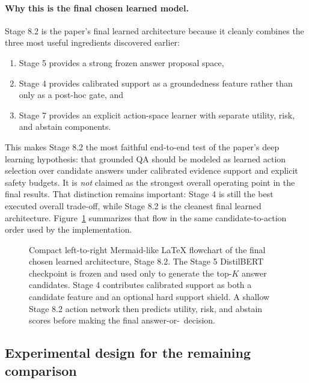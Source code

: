 \paragraph{Why this is the final chosen learned model.}
Stage 8.2 is the paper's final learned architecture because it cleanly
combines the three most useful ingredients discovered earlier:
\begin{enumerate}[leftmargin=1.25em]
  \item Stage 5 provides a strong frozen answer proposal space,
  \item Stage 4 provides calibrated support as a groundedness feature rather
  than only as a post-hoc gate, and
  \item Stage 7 provides an explicit action-space learner with separate
  utility, risk, and abstain components.
\end{enumerate}
This makes Stage 8.2 the most faithful end-to-end test of the paper's deep
learning hypothesis:
that grounded QA should be modeled as learned action selection over candidate
answers under calibrated evidence support and explicit safety budgets.
It is \emph{not} claimed as the strongest overall operating point in the final
results.
That distinction remains important:
Stage 4 is still the best executed overall trade-off, while Stage 8.2 is the
cleanest final learned architecture.
Figure~\ref{fig:stage8-2-architecture} summarizes that flow in the same
candidate-to-action order used by the implementation.

\begin{figure}[t]
  \centering
  \resizebox{0.98\textwidth}{!}{}
  \caption{Compact left-to-right Mermaid-like LaTeX flowchart of the final chosen learned
  architecture, Stage 8.2.
  The Stage 5 DistilBERT checkpoint is frozen and used only to generate the
  top-\(K\) answer candidates.
  Stage 4 contributes calibrated support as both a candidate feature and an
  optional hard support shield.
  A shallow Stage 8.2 action network then predicts utility, risk, and abstain
  scores before making the final answer-or-\abstain\ decision.}
  \label{fig:stage8-2-architecture}
\end{figure}

\subsection{Experimental design for the remaining comparison}

